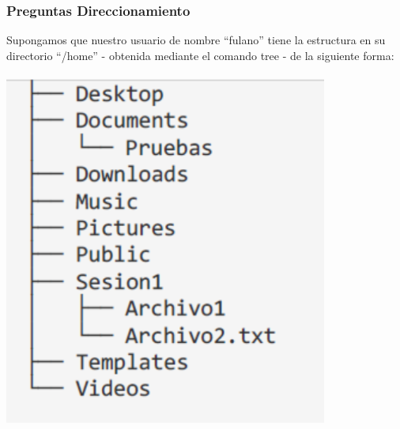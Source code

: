 \documentclass{article}
\begin{document}
\subsubsection{Preguntas Direccionamiento}
Supongamos que nuestro usuario de nombre “fulano” tiene la estructura en su directorio “/home” - obtenida mediante el comando tree - de la siguiente forma: \\
\\ 
\includegraphics[scale=0.25]{LinuxCapturas/ejercicio.png}
\end{document}
